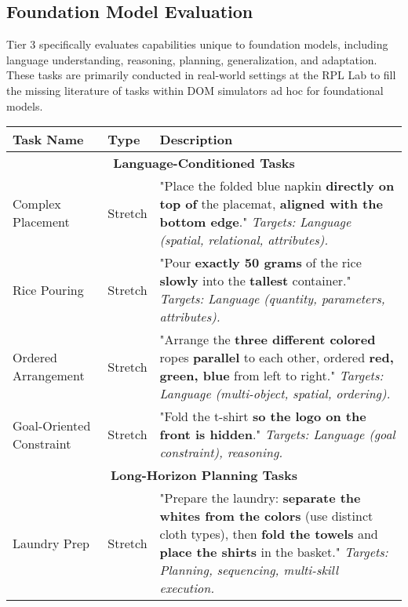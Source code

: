 \subsection{Foundation Model Evaluation}
\label{app:task_suite_3}

Tier 3 specifically evaluates capabilities unique to foundation models, including language understanding, reasoning, planning, generalization, and adaptation. These tasks are primarily conducted in real-world settings at the RPL Lab to fill the missing literature of tasks within DOM simulators ad hoc for foundational models.

\begin{table}[h]
\centering
\begin{tabular}{|p{3.5cm}|p{2cm}|p{8.5cm}|}
\hline
\textbf{Task Name} & \textbf{Type} & \textbf{Description} \\
\hline
\multicolumn{3}{|c|}{\textbf{Language-Conditioned Tasks}} \\
\hline
Complex Placement & Stretch & "Place the folded blue napkin \textbf{directly on top of} the placemat, \textbf{aligned with the bottom edge}." \textit{Targets: Language (spatial, relational, attributes).} \\
\hline
Rice Pouring & Stretch & "Pour \textbf{exactly 50 grams} of the rice \textbf{slowly} into the \textbf{tallest} container." \textit{Targets: Language (quantity, parameters, attributes).} \\
\hline
Ordered Arrangement & Stretch & "Arrange the \textbf{three different colored} ropes \textbf{parallel} to each other, ordered \textbf{red, green, blue} from left to right." \textit{Targets: Language (multi-object, spatial, ordering).} \\
\hline
Goal-Oriented Constraint & Stretch & "Fold the t-shirt \textbf{so the logo on the front is hidden}." \textit{Targets: Language (goal constraint), reasoning.} \\
\hline
\multicolumn{3}{|c|}{\textbf{Long-Horizon Planning Tasks}} \\
\hline
Laundry Prep & Stretch & "Prepare the laundry: \textbf{separate the whites from the colors} (use distinct cloth types), then \textbf{fold the towels} and \textbf{place the shirts} in the basket." \textit{Targets: Planning, sequencing, multi-skill execution.} \\

\end{tabular}
\end{table}
